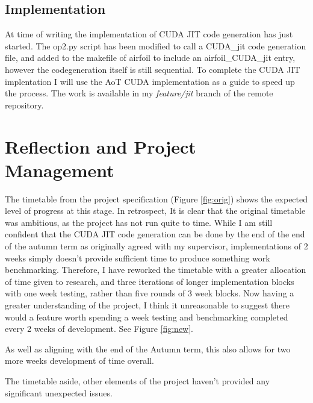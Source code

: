 \documentclass[11pt]{article}
\begin{document}
\subsection*{Implementation}
At time of writing the implementation of CUDA JIT code generation has just started. The op2.py script has been modified to call a CUDA\_jit code generation file, and added to the makefile of airfoil to include an airfoil\_CUDA\_jit entry, however the codegeneration itself is still sequential. To complete the CUDA JIT implentation I will use the AoT CUDA implementation as a guide to speed up the process. The work is available in my \textit{feature/jit} branch of the remote repository.

\section*{Reflection and Project Management}
The timetable from the project specification (Figure \ref{fig:orig}) shows the expected level of progress at this stage. In retrospect, It is clear that the original timetable was ambitious, as the project has not run quite to time. While I am still confident that the CUDA JIT code generation can be done by the end of the end of the autumn term as originally agreed with my supervisor, implementations of 2 weeks simply doesn't provide sufficient time to produce something work benchmarking. Therefore, I have reworked the timetable with a greater allocation of time given to research, and three iterations of longer implementation blocks with one week testing, rather than five rounds of 3 week blocks. Now having a greater understanding of the project, I think it unreasonable to suggest there would a feature worth spending a week testing and benchmarking completed every 2 weeks of development. See Figure \ref{fig:new}.
\par As well as aligning with the end of the Autumn term, this also allows for two more weeks development of time overall.
\par The timetable aside, other elements of the project haven't provided any significant unexpected issues. 
\newcommand\w{25}
\end{document}
